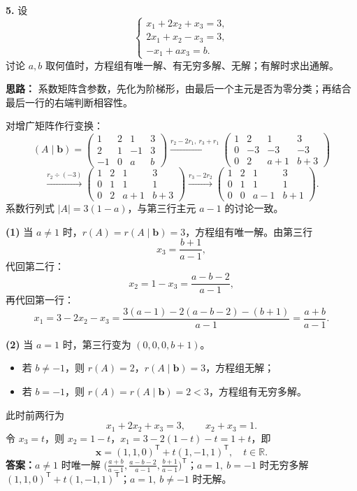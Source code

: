 \textbf{5.} 设
\[
\begin{cases}
x_1+2x_2+x_3=3,\\
2x_1+x_2-x_3=3,\\
-x_1+ax_3=b.
\end{cases}
\]
讨论 \(a,b\) 取何值时，方程组有唯一解、有无穷多解、无解；有解时求出通解。

\ifshowsolutions%
\textbf{思路：} 系数矩阵含参数，先化为阶梯形，由最后一个主元是否为零分类；再结合最后一行的右端判断相容性。

对增广矩阵作行变换：
\[
(A\mid\boldsymbol{b})=
\begin{pmatrix}
1&2&1&3\\
2&1&-1&3\\
-1&0&a&b
\end{pmatrix}
\xrightarrow{r_2-2r_1,\ r_3+r_1}
\begin{pmatrix}
1&2&1&3\\
0&-3&-3&-3\\
0&2&a+1&b+3
\end{pmatrix}
\]
\[
\xrightarrow{r_2\div(-3)}
\begin{pmatrix}
1&2&1&3\\
0&1&1&1\\
0&2&a+1&b+3
\end{pmatrix}
\xrightarrow{r_3-2r_2}
\begin{pmatrix}
1&2&1&3\\
0&1&1&1\\
0&0&a-1&b+1
\end{pmatrix}.
\]
系数行列式 \(|A|=3(1-a)\)，与第三行主元 \(a-1\) 的讨论一致。

\textbf{(1)} 当 \(a\ne1\) 时，\(r(A)=r(A\mid\boldsymbol{b})=3\)，方程组有唯一解。由第三行
\[
x_3=\frac{b+1}{a-1},
\]
代回第二行：
\[
x_2=1-x_3=\frac{a-b-2}{a-1},
\]
再代回第一行：
\[
x_1=3-2x_2-x_3
=\frac{3(a-1)-2(a-b-2)-(b+1)}{a-1}
=\frac{a+b}{a-1}.
\]

\textbf{(2)} 当 \(a=1\) 时，第三行变为 \((0,0,0,b+1)\)。
\begin{itemize}
  \item 若 \(b\ne-1\)，则 \(r(A)=2\)，\(r(A\mid\boldsymbol{b})=3\)，方程组无解；
  \item 若 \(b=-1\)，则 \(r(A)=r(A\mid\boldsymbol{b})=2<3\)，方程组有无穷多解。
\end{itemize}
此时前两行为
\[
x_1+2x_2+x_3=3,\qquad x_2+x_3=1.
\]
令 \(x_3=t\)，则 \(x_2=1-t\)，\(x_1=3-2(1-t)-t=1+t\)，即
\[
\boldsymbol{x}=(1,1,0)^{\mathsf T}+t(1,-1,1)^{\mathsf T},\quad t\in\mathbb R.
\]
\textbf{答案：}$a\ne1$ 时唯一解 $\bigl(\frac{a+b}{a-1},\frac{a-b-2}{a-1},\frac{b+1}{a-1}\bigr)^{\mathsf T}$；$a=1,\ b=-1$ 时无穷多解 $(1,1,0)^{\mathsf T}+t(1,-1,1)^{\mathsf T}$；$a=1,\ b\ne-1$ 时无解。
\else \answerarea[10] \fi%

